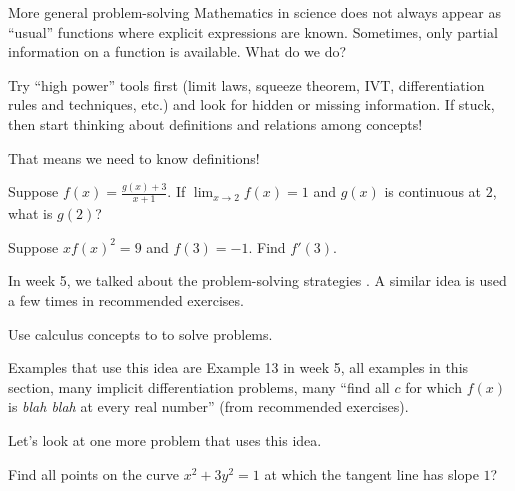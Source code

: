 \documentclass[../main.tex]{subfiles}
\begin{document}
\begin{lesson}{More general problem-solving}
  Mathematics in science does not always appear as ``usual'' functions where explicit expressions are known. Sometimes, only partial information on a function is available. What do we do?

  \begin{mdframed}[style=simple-compact]
    Try ``high power'' tools first (limit laws, squeeze theorem, IVT, differentiation rules and techniques, etc.) and look for hidden or missing information. If stuck, then start thinking about definitions and relations among concepts!

    That means we need to know definitions!
  \end{mdframed}

  \begin{example}
    Suppose \(f(x) = \frac{g(x) + 3}{x+1}\).  If \(\lim_{x \to 2} f(x) = 1\) and \(g(x)\) is continuous at \(2\), what is \(g(2)\)?
  \end{example}

  \begin{example}
    Suppose \(xf(x)^{2} = 9\) and \(f(3) = -1\). Find \(f'(3)\).

  \end{example}
  \clearpage

  In week 5, we talked about the problem-solving strategies . A similar idea is used a few times in recommended exercises.
  \begin{mdframed}[style=simple-compact] \label{strategy:formulate-equation}
    Use calculus concepts to  to solve problems.
  \end{mdframed}

  Examples that use this idea are Example 13 in week 5, all examples in this section, many implicit differentiation problems, many ``find all \(c\) for which \(f(x)\) is \emph{blah blah} at every real number'' (from recommended exercises).

  Let's look at one more problem that uses this idea. 

  \begin{example}
    Find all points on the curve \(x^{2} + 3y^{2} = 1\) at which the tangent line has slope \(1\)?
    
  \end{example}
\end{lesson}
\end{document}
